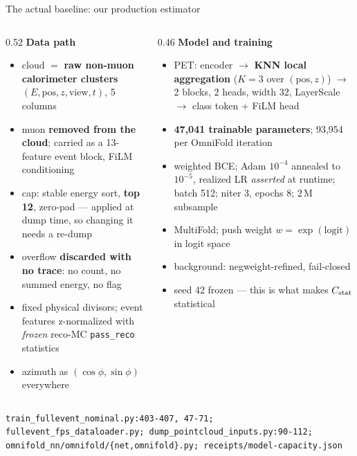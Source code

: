 \documentclass[aspectratio=169,10pt]{beamer}
\newcommand{\warn}[1]{\textcolor{warn}{#1}}
\newcommand{\src}[1]{{\scriptsize\color{gray}\texttt{#1}}}
\begin{document}
\begin{frame}{The actual baseline: our production estimator}
  \begin{columns}[T]
    \begin{column}{0.52\textwidth}
      {\small\textbf{Data path}}
      \begin{itemize}\footnotesize
        \item cloud $=$ \textbf{raw non-muon calorimeter clusters}
          $(E,\mathrm{pos},z,\mathrm{view},t)$, 5 columns
        \item muon \textbf{removed from the cloud}; carried as a 13-feature event block,
          FiLM conditioning
        \item cap: stable energy sort, \textbf{top 12}, zero-pad ---
          applied \warn{at dump time}, so changing it needs a re-dump
        \item overflow \textbf{discarded with no trace}: no count, no summed energy, no flag
        \item fixed physical divisors; event features z-normalized with \emph{frozen}
          reco-MC \texttt{pass\_reco} statistics
        \item azimuth as $(\cos\phi,\sin\phi)$ everywhere
      \end{itemize}
    \end{column}
    \begin{column}{0.46\textwidth}
      {\small\textbf{Model and training}}
      \begin{itemize}\footnotesize
        \item PET: encoder $\to$ \textbf{KNN local aggregation} ($K=3$ over
          $(\mathrm{pos},z)$) $\to$ 2 blocks, 2 heads, width 32, LayerScale $\to$
          class token + FiLM head
        \item \textbf{47{,}041 trainable parameters}; 93{,}954 per OmniFold iteration
        \item weighted BCE; Adam $10^{-4}$ annealed to $10^{-5}$, realized LR
          \emph{asserted} at runtime; batch 512; niter 3, epochs 8; 2\,M subsample
        \item MultiFold; push weight $w=\exp(\mathrm{logit})$ in logit space
        \item background: negweight-refined, fail-closed
        \item seed 42 frozen --- this is what makes $C_{\rm stat}$ statistical
      \end{itemize}
    \end{column}
  \end{columns}
  \vspace{0.3em}
  \src{train\_fullevent\_nominal.py:403-407, 47-71; fullevent\_fps\_dataloader.py;
       dump\_pointcloud\_inputs.py:90-112; omnifold\_nn/omnifold/\{net,omnifold\}.py;
       receipts/model-capacity.json}
\end{frame}
\end{document}
